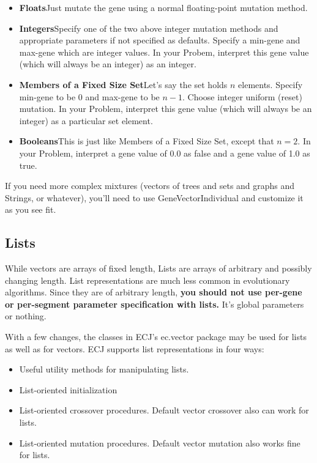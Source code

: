 \documentclass[twoside,10pt]{book}
\newcommand\package[1]{\index{#1}\textsf{#1}}
\newcommand\class[1]{\index{#1}\textsf{#1}}
\begin{document}
\begin{itemize}
\item {\bf Floats}\qquad Just mutate the gene using a normal floating-point mutation method.
\item {\bf Integers}\qquad Specify one of the two above integer mutation methods and appropriate parameters if not specified as defaults.  Specify a min-gene and max-gene which are integer values.  In your Probem, interpret this gene value (which will always be an integer) as an integer.
\item {\bf Members of a Fixed Size Set}\qquad Let's say the set holds \(n\) elements.  Specify min-gene to be 0 and max-gene to be \(n-1\).  Choose integer uniform (reset) mutation.  In your Problem, interpret this gene value (which will always be an integer) as a particular set element.
\item {\bf Booleans}\qquad This is just like Members of a Fixed Size Set, except that \(n=2\).  In your Problem, interpret a gene value of 0.0 as false and a gene value of 1.0 as true.
\end{itemize}

If you need more complex mixtures (vectors of trees and sets and graphs and Strings, or whatever), you'll need to use \class{GeneVectorIndividual} and customize it as you see fit.

\subsection{Lists}
\label{list}

While vectors are arrays of fixed length, Lists are arrays of arbitrary and possibly changing length.  List representations are much less common in evolutionary algorithms.  Since they are of arbitrary length, {\bf you should not use per-gene or per-segment parameter specification with lists.} It's global parameters or nothing.

With a few changes, the classes in ECJ's \package{ec.vector} package may be used for lists as well as for vectors.  ECJ supports list representations in four ways:

\begin{itemize}
\item Useful utility methods for manipulating lists.
\item List-oriented initialization
\item List-oriented crossover procedures.  Default vector crossover also can work for lists.
\item List-oriented mutation procedures.  Default vector mutation also works fine for lists.
\end{itemize}
\end{document}
